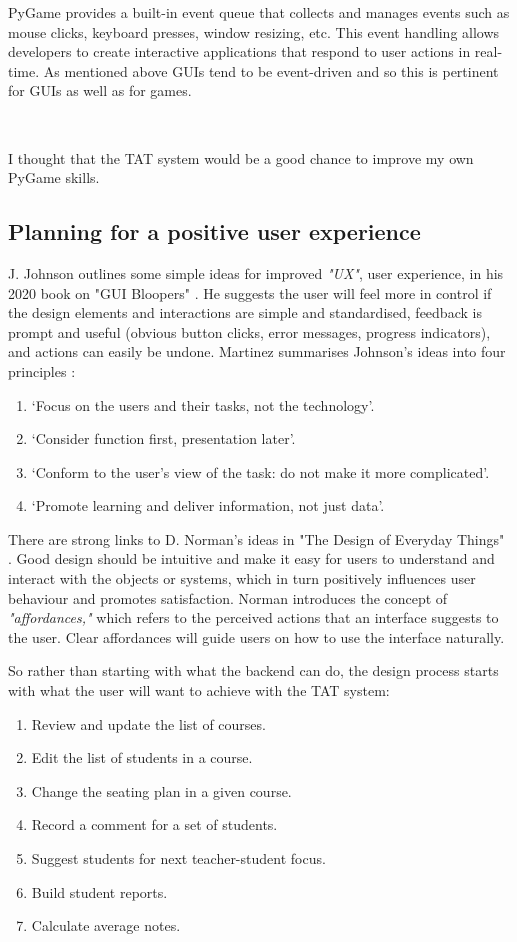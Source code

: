 \documentclass[10pt]{article}
\begin{document}
PyGame provides a built-in event queue that collects and manages events such as mouse clicks, keyboard presses, window resizing, etc. This event handling allows developers to create interactive applications that respond to user actions in real-time. As mentioned above GUIs tend to be event-driven and so this is pertinent for GUIs as well as for games.

\

I thought that the TAT system would be a good chance to improve my own PyGame skills.


\subsection{Planning for a positive user experience}
J. Johnson outlines some simple ideas for improved \emph{"UX"}, user experience, in his 2020 book on "GUI Bloopers" \cite{JJo20}. He suggests the user will feel more in control if the design elements and interactions are simple and standardised, feedback is prompt and useful (obvious button clicks, error messages, progress indicators), and actions can easily be undone. Martinez summarises Johnson's ideas into four principles \cite[p. 123]{Mart11}:
\begin{enumerate}
\item ‘Focus on the users and their tasks, not the technology’.
\item ‘Consider function first, presentation later’.
\item ‘Conform to the user’s view of the task: do not make it more complicated’.
\item ‘Promote learning and deliver information, not just data’.
\end{enumerate}

There are strong links to D. Norman's ideas in "The Design of Everyday Things" \cite{Norm13}. Good design should be intuitive and make it easy for users to understand and interact with the objects or systems, which in turn positively influences user behaviour and promotes satisfaction. Norman introduces the concept of \emph{"affordances,"} which refers to the perceived actions that an interface suggests to the user. Clear affordances will guide users on how to use the interface naturally.

So rather than starting with what the backend can do, the design process starts with what the user will want to achieve with the TAT system:
\begin{enumerate}
\item Review and update the list of courses.
\item Edit the list of students in a course.
\item Change the seating plan in a given course.
\item Record a comment for a set of students.
\item Suggest students for next teacher-student focus.
\item Build student reports.
\item Calculate average notes.
\end{enumerate}
\end{document}
